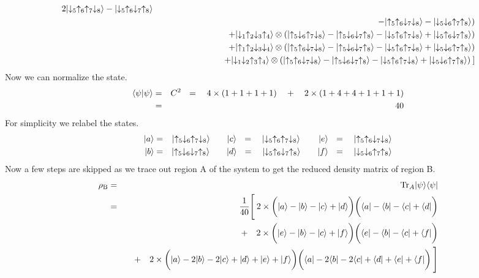 \begin{eqnarray*}
	             	 2\ket{\dw_5\up_6\up_7\dw_8} - \ket{\dw_5\up_6\dw_7\up_8} \\
		 &&\hspace{3.5in}
		 	-\ket{\up_5\up_6\dw_7\dw_8} - \ket{\dw_5\dw_6\up_7\up_8}) \\
		&& \: + \ket{\dw_1\up_2\dw_3\up_4} \ox
			\left(\ket{\up_5\dw_6\up_7\dw_8} - \ket{\up_5\dw_6\dw_7\up_8} -
			\ket{\dw_5\up_6\up_7\dw_8} + \ket{\dw_5\up_6\dw_7\up_8}\right) \\
		&& \: + \ket{\up_1\up_2\dw_3\dw_4} \ox
			\left(\ket{\up_5\up_6\dw_7\dw_8} - \ket{\up_5\dw_6\dw_7\up_8} -
			\ket{\dw_5\up_6\up_7\dw_8} + \ket{\dw_5\dw_6\up_7\up_8}\right) \\
		&& \: + \ket{\dw_1\dw_2\up_3\up_4} \ox
			\left(\ket{\up_5\up_6\dw_7\dw_8} - \ket{\up_5\dw_6\dw_7\up_8} -
			\ket{\dw_5\up_6\up_7\dw_8} + \ket{\dw_5\dw_6\up_7\up_8}\right)\:] \end{eqnarray*}
Now we can normalize the state.
\begin{eqnarray*}
\langle {\psi} \rvert \psi \rangle & = & C^2 \: \: \: = \quad 4 \times ( 1 + 1 + 1 + 1 ) \quad+  
								\quad 2 \times (1 + 4 + 4 + 1 + 1+ 1) \\
				& = & 40
\end{eqnarray*}
For simplicity we relabel the states.
\begin{eqnarray*}
	\lvert {a} \rangle &=& \lvert {\uparrow_5\downarrow_6\uparrow_7\downarrow_8} \rangle  \qquad  \lvert {c} \rangle \: \: \: = \quad \lvert {\downarrow_5\uparrow_6\uparrow_7\downarrow_8} \rangle \qquad  \,\lvert {e} \rangle \: \: \: = \quad\lvert {\uparrow_5\uparrow_6\downarrow_7\downarrow_8} \rangle \\
	\lvert {b} \rangle &=& \lvert {\uparrow_5\downarrow_6\downarrow_7\uparrow_8} \rangle  \qquad  \lvert {d} \rangle \: \: \: = \quad \lvert {\downarrow_5\uparrow_6\downarrow_7\uparrow_8} \rangle \qquad  \lvert {f} \rangle \: \: \: = \quad \lvert {\downarrow_5\downarrow_6\uparrow_7\uparrow_8} \rangle 
\end{eqnarray*}
Now a few steps are skipped as we trace out region A of the system to get the reduced density matrix of region B.
\begin{eqnarray*}
	\rho_{\rm B} &=& {\rm Tr}_A \lvert {\psi} \rangle\langle {\psi} \rvert \\
		&=& \frac{1}{40}\Bigg[ \:2\times \bigg( \lvert {a} \rangle - \lvert {b} \rangle -\lvert {c} \rangle + \lvert {d} \rangle \bigg)\bigg(\langle {a} \rvert-\langle {b} \rvert-\langle {c} \rvert+\langle {d} \rvert\bigg) \\
		&&\quad + \quad
			2\times\bigg( \lvert {e} \rangle - \lvert {b} \rangle -\lvert {c} \rangle + \lvert {f} \rangle \bigg)\bigg(\langle {e} \rvert-\langle {b} \rvert-\langle {c} \rvert+\langle {f} \rvert\bigg) \\
		&&  \quad + \quad 2\times \bigg(\lvert {a} \rangle-2\lvert {b} \rangle-2\lvert {c} \rangle+\lvert {d} \rangle+\lvert {e} \rangle+\lvert {f} \rangle\bigg)
			\bigg(\langle {a} \rvert-2\langle {b} \rvert-2\langle {c} \rvert+\langle {d} \rvert+\langle {e} \rvert+\langle {f} \rvert\bigg)\:\Bigg]
\end{eqnarray*}
